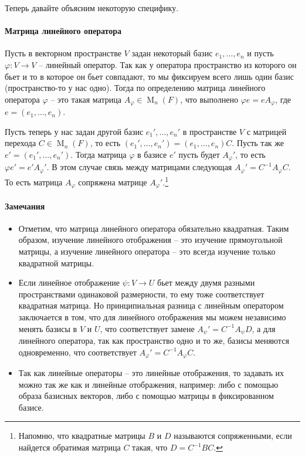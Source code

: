 Теперь давайте объясним некоторую специфику.

\paragraph{Матрица линейного оператора}

Пусть в векторном пространстве $V$ задан  некоторый базис $e_1,\ldots, e_n$ и пусть $\varphi \colon V\to V$ -- линейный оператор. Так как у оператора пространство из которого он бьет и то в которое он бьет совпадают, то мы фиксируем всего лишь один базис (пространство-то у нас одно). Тогда по определению матрица линейного оператора $\varphi$ -- это такая матрица $A_\varphi\in \operatorname{M}_{n}(F)$, что выполнено $\varphi e = e A_\varphi$, где $e = (e_1,\ldots,e_n)$.

Пусть теперь у нас задан другой базис $e_1',\ldots,e_n'$ в пространстве $V$ с матрицей перехода $C\in \operatorname{M}_n(F)$, то есть $(e_1',\ldots,e_n') = (e_1,\ldots,e_n)C$. Пусть так же $e' = (e_1',\ldots,e_n')$. Тогда матрица $\varphi$ в базисе $e'$ пусть будет $A_\varphi'$, то есть $\varphi e' = e' A_\varphi'$. В этом случае связь между матрицами следующая $A_\varphi' = C^{-1}A_\varphi C$. То есть матрица $A_\varphi$ сопряжена матрице $A_\varphi'$.\footnote{Напомню, что квадратные матрицы $B$ и $D$ называются сопряженными, если найдется обратимая матрица $C$ такая, что $D= C^{-1}BC$.}

\paragraph{Замечания}
\begin{itemize}
\item Отметим, что матрица линейного оператора обязательно квадратная. Таким образом, изучение линейного отображения -- это изучение прямоугольной матрицы, а изучение линейного оператора -- это всегда изучение только квадратной матрицы. 

\item Если линейное отображение $\psi\colon V\to U$ бьет между двумя разными пространствами одинаковой размерности, то ему тоже соответствует квадратная матрица. Но принципиальная разница с линейным оператором заключается в том, что для линейного отображения мы можем независимо менять базисы в $V$ и $U$, что соответствует замене $A_\psi' = C^{-1}A_\psi D$, а для линейного оператора, так как пространство одно и то же, базисы меняются одновременно, что соответствует $A_\varphi' = C^{-1}A_\varphi C$.

\item Так как линейные операторы -- это линейные отображения, то задавать их можно так же как и линейные отображения, например: либо с помощью образа базисных векторов, либо с помощью матрицы в фиксированном базисе.
\end{itemize}

